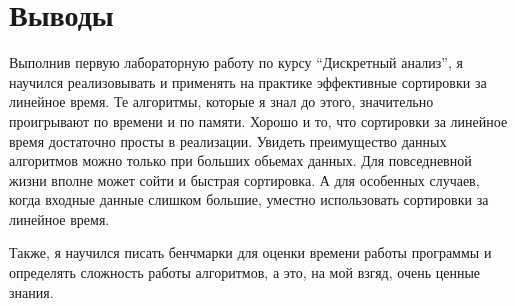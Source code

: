 \section{Выводы}

Выполнив первую лабораторную работу по курсу \enquote{Дискретный анализ}, я научился реализовывать и применять на практике эффективные сортировки за линейное время. Те алгоритмы, которые я знал до этого, значительно проигрывают по времени и по памяти. Хорошо и то, что сортировки за линейное время достаточно просты в реализации.
Увидеть преимущество данных алгоритмов можно только при больших обьемах данных. Для повседневной жизни вполне может сойти и быстрая сортировка. А для особенных случаев, когда входные данные слишком большие, уместно использовать сортировки за линейное время.

Также, я научился писать бенчмарки для оценки времени работы программы и определять сложность работы алгоритмов, а это, на мой взгяд, очень ценные знания.   
\pagebreak